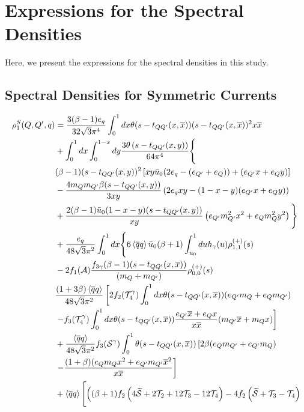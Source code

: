 \section{Expressions for the Spectral Densities}
\label{appndxb}
Here, we present the expressions for the spectral densities in this study.
\subsection{Spectral Densities for Symmetric Currents}
%
\begin{align}   
        \nonumber\rho_1^S(Q,Q^\prime,q) &= \dfrac{3(\beta-1)e_q}{32\sqrt{3}\pi^4} \int_0^1 dx \theta(s-t_{QQ^\prime}(x,\overline{x}))(s-t_{QQ^\prime}(x,\overline{x}))^2x\xbar\\
        \nonumber& +\int_0^1 dx \int_0^{1-x} dy \dfrac{3\theta\left(s-t_{QQ^\prime}(x,y)\right)}{64\pi^4}\Bigg\{\\
        \nonumber&(\beta-1)(s-t_{QQ^\prime}(x,y))^2\left[xy\bar{u}_0(2e_q - (e_{Q^\prime} +e_Q) )+(e_{Q^\prime}x+e_Qy)\right]\\
        \nonumber&-\dfrac{4m_Qm_{Q^\prime}\beta(s-t_{QQ^\prime}(x,y))}{3xy}\left(2e_qxy-(1-x-y)(e_{Q^\prime}x+e_Qy)\right)\\
        \nonumber&+\dfrac{2(\beta-1)\bar{u}_0(1-x-y)(s-t_{QQ^\prime}(x,y))}{xy}\left(e_{Q^\prime}m_{Q^\prime}^2x^2+e_Qm_Q^2y^2\right)\Bigg\}\\
        \nonumber&+ \dfrac{e_q}{48\sqrt{3}\pi^2} \int_0^1 dx \Bigg\{ 6\qbarq \bar{u}_0 (\beta+1) \int_{u_0}^1 du  h_\gamma(u)\rhonp{1,1} \\ 
        \nonumber&- 2f_1(\mathcal{A}) \dfrac{f_{3\gamma} (\beta-1)(s-t_{QQ^\prime}(x,\overline{x}))}{(m_Q+m_{Q^\prime})}\rhonp{0,0}\\
        \nonumber&\dfrac{(1+3\beta)\qbarq}{48\sqrt{3}\pi^2}\left[2f_2(\mathcal{T}_4^\gamma)\int_0^1dx\theta(s-t_{QQ^\prime}(x,\xbar))(e_{Q^\prime}m_Q+e_Qm_{Q^\prime})\right.\\
        &\left.-f_3(\mathcal{T}_4^\gamma)\int_0^1dx\theta(s-t_{QQ^\prime}(x,\xbar))\dfrac{e_{Q^\prime}\xbar+e_Qx}{x\xbar}(m_{Q^\prime}\xbar+m_Qx)\right]\\
        \nonumber&+\dfrac{\qbarq}{48\sqrt{3}\pi^2}f_3(\mathcal{S}^\gamma)\int_0^1\theta(s-t_{QQ^\prime}(x,\xbar)) \left[2\beta(e_Qm_{Q^\prime}+e_{Q^\prime}m_Q)\right.\\
        \nonumber&\left.-\dfrac{(1+\beta)(e_Qm_Qx^2+e_{Q^\prime}m_{Q^\prime}\xbar^2}{x\xbar}\right]\\
        \nonumber&+\qbarq\Bigg[ \Big((\beta+1) f_2\left(4\widetilde{\mathcal{S}}+2\mathcal{T}_2+12\mathcal{T}_3-12\mathcal{T}_4\right) - 4f_2\left(\widetilde{\mathcal{S}}+\nonumber\mathcal{T}_3-\mathcal{T}_4\right) \\

\end{align}
